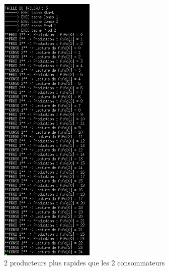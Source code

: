 \documentclass[a4paper,12pt]{report}
\begin{document}
\begin{figure}[h]
	\centering
		\includegraphics[width=0.4\textwidth]{screens/prod_plus_rapide_sem_2prod_meme_vitesse_2conso_meme_vitesse_TRAFIK.png}
		\caption{2 producteurs plus rapides que les 2 consommateurs}
		\label{prod_plus_rapide_sem_2prod_meme_vitesse_2conso_meme_vitesse_TRAFIK}
\end{figure}

\newpage
\end{document}
